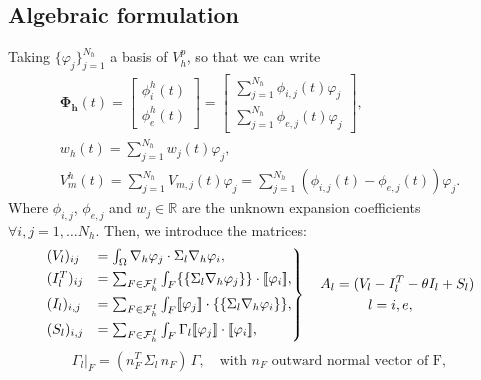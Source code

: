 \documentclass[a4paper,11pt]{article}
\begin{document}
    \subsection{Algebraic formulation}
    Taking $\{\varphi_j\}_{j=1}^{N_h}$ a basis of $V_h^p$, so that we can write
    \begin{equation*}
    \begin{gathered}
    \bm{\Phi_h}(t) = \begin{bmatrix} \phi_i^h(t) \\ \phi_e^h(t) \end{bmatrix} = \begin {bmatrix}\sum_{j=1}^{N_h} \phi_{i,j}(t)\varphi_j \\ \sum_{j=1}^{N_h} \phi_{e,j}(t)\varphi_j \end{bmatrix},\\
    w_h(t) = \sum_{j=1}^{N_h}w_j(t)\varphi_j,\\
    V_m^h(t)=\sum_{j=1}^{N_h} V_{m,j}(t) \varphi_j=\sum_{j=1}^{N_h}(\phi_{i,j}(t)-\phi_{e,j}(t))\varphi_j.
 \end{gathered}
 \end{equation*}
 Where $\phi_{i,j}$, $\phi_{e,j}$ and $w_j \in \mathbb{R}$ are the unknown expansion coefficients $\forall i,j=1,\dots N_h$.
 Then, we introduce the matrices:
 \begin{equation*}
\begin{rcases}
(V_l)_{ij} &= \int_{\Omega}\nabla_h\varphi_j \cdot \Sigma_l \nabla_h \varphi_i,
\\ (I_l^T)_{ij} &= \sum_{F \in \mathcal{F}_h^I} \int_{F} \{\{\Sigma_l \nabla_h\varphi_j\}\} \cdot [\![\varphi_i]\!],
\\ (I_l)_{i,j} &= \sum_{F \in \mathcal{F}_h^I} \int_{F} [\![\varphi_j]\!] \cdot \{\{\Sigma_l \nabla_h \varphi_i\}\},
\\(S_l)_{i,j} &= \sum_{F \in \mathcal{F}_h^I} \int_{F} \Gamma_l[\![\varphi_j]\!] \cdot [\![\varphi_i]\!],
\end{rcases}
\begin{gathered}
\quad A_l = (V_l -I_l^T - \theta I_l + S_l)\\
l=i,e, \\
\end{gathered}
\end{equation*}
\begin{equation*}
\Gamma_l\vert_F = (n_F^T \, \Sigma_l \, n_F) \,\Gamma, \quad \text{with } n_F \text{ outward normal vector of F},
\end{equation*} \vspace{0mm} \\
\end{document}
